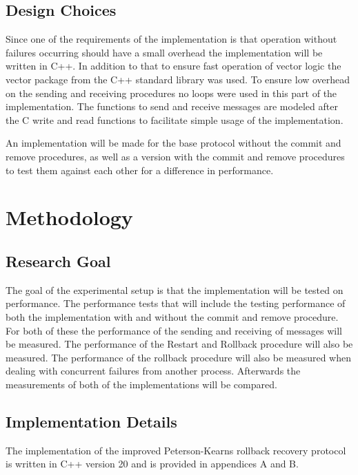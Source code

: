 \documentclass[twocolumn, a4paper,11pt]{article}%
\begin{document}
\subsection{Design Choices}
Since one of the requirements of the implementation is that operation without failures occurring should have a small overhead the implementation will be written in C++. In addition to that to ensure fast operation of vector logic the vector package from the C++ standard library was used. To ensure low overhead on the sending and receiving procedures no loops were used in this part of the implementation. The functions to send and receive messages are modeled after the C write and read functions to facilitate simple usage of the implementation.
\par An implementation will be made for the base protocol without the commit and remove procedures, as well as a version with the commit and remove procedures to test them against each other for a difference in performance. 

\section{Methodology}

\subsection{Research Goal}
\par The goal of the experimental setup is that the implementation will be tested on performance.  The performance tests that will include the testing performance of both the implementation with and without the commit and remove procedure. For both of these the performance of the sending and receiving of messages will be measured. The performance of the Restart and Rollback procedure will also be measured. The performance of the rollback procedure will also be measured when dealing with concurrent failures from another process. Afterwards the measurements of both of the implementations will be compared.

\subsection{Implementation Details}
\par The implementation of the improved Peterson-Kearns rollback recovery protocol is written in C++ version 20 and is provided in appendices A and B.
\end{document}
